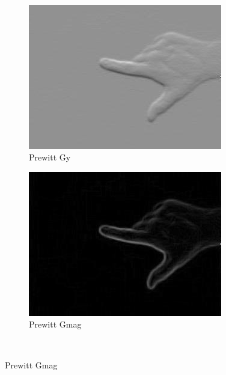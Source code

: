 \begin{figure}
    ~ %
    \begin{subfigure}[b]{0.3\textwidth}
        \includegraphics[width=\textwidth]{image/gradiente_prewitt_gy.jpg}
        \caption{Prewitt Gy}
        \label{fig:gradiente_gy}
    \end{subfigure}
    \begin{subfigure}[b]{0.3\textwidth}
        \includegraphics[width=\textwidth]{image/gradiente_prewitt_mag.jpg}
        \caption{Prewitt Gmag}
        \label{fig:gradiente_gmag}
    \end{subfigure}%
    ~ %

\end{figure}
